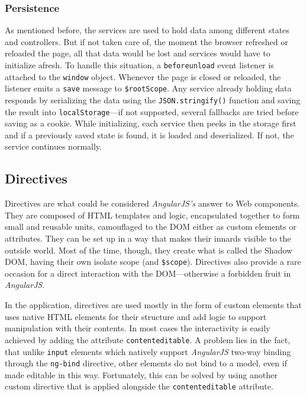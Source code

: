 \documentclass[thesis=M,english,hidelinks]{FITthesis}[2012/10/20]
\newcommand{\code}{\texttt}
\begin{document}
    \subsubsection{Persistence}

As mentioned before, the services are used to hold data among different states and controllers. But if not taken care of, the moment the browser refreshed or reloaded the page, all that data would be lost and services would have to initialize afresh. To handle this situation, a \code{beforeunload} event listener is attached to the \code{window} object. Whenever the page is closed or reloaded, the listener emits a \code{save} message to \code{\$rootScope}. Any service already holding data responds by serializing the data using the \code{JSON.stringify()} function and saving the result into \code{localStorage}---if not supported, several fallbacks are tried before saving as a cookie. While initializing, each service then peeks in the storage first and if a previously saved state is found, it is loaded and deserialized. If not, the service continues normally.

  \subsection{Directives}

Directives are what could be considered \textit{AngularJS's} answer to Web components. They are composed of HTML templates and logic, encapsulated together to form small and reusable units, camouflaged to the DOM either as custom elements or attributes. They can be set up in a way that makes their innards visible to the outside world. Most of the time, though, they create what is called the Shadow DOM, having their own isolate scope (and \code{\$scope}). Directives also provide a rare occasion for a direct interaction with the DOM---otherwise a forbidden fruit in \textit{AngularJS}.

In the application, directives are used mostly in the form of custom elements that uses native HTML elements for their structure and add logic to support manipulation with their contents. In most cases the interactivity is easily achieved by adding the attribute \code{contenteditable}. A problem lies in the fact, that unlike \code{input} elements which natively support \textit{AngularJS} two-way binding through the \code{ng-bind} directive, other elements do not bind to a model, even if made editable in this way. Fortunately, this can be solved by using another custom directive that is applied alongside the \code{contenteditable} attribute.
\end{document}
